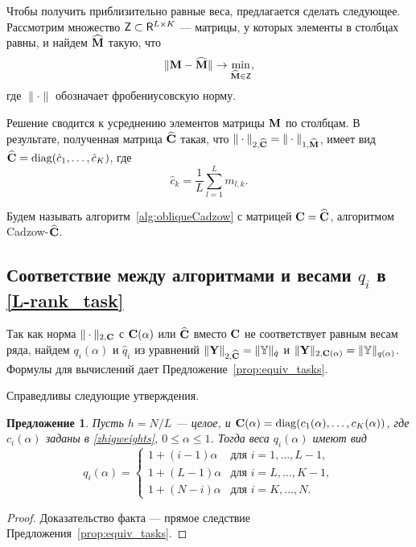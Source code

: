 \documentclass[12pt, specialist, subf,href,colorlinks=true,substylefile = spbu.rtx]{disser}
\newtheorem{proposition}{Предложение}
\theoremstyle{remark}
\theoremstyle{definition}
\begin{document}
Чтобы получить приблизительно равные веса, предлагается сделать следующее. Рассмотрим множество $\mathsf{Z} \subset \mathsf{R}^{L \times K}$ --- матрицы, у которых элементы в столбцах равны, и найдем $\widehat{\mathbf{M}}$ такую, что
\begin{equation*}
\|\mathbf{M} - \widehat{\mathbf{M}}\| \to \min_{\widehat{\mathbf{M}} \in \mathsf{Z}},
\end{equation*}
где $\|\cdot\|$ обозначает фробениусовскую норму.

Решение сводится к усреднению элементов матрицы $\mathbf{M}$ по столбцам.  В результате, полученная матрица $\widehat{\mathbf{C}}$ такая, что $\|\cdot\|_{2,\widehat{\mathbf{C}}}=\|\cdot\|_{1,\widehat{\mathbf{M}}}$, имеет вид $\widehat{\mathbf{C}} = \text{diag}(\hat c_1, \ldots, \hat c_K)$, где
\begin{equation}\label{my_s}
\hat c_k = \frac{1}{L}\sum_{l=1}^L m_{l, k}.
\end{equation}

Будем называть алгоритм~\ref{alg:obliqueCadzow} с матрицей $\mathbf{C}=\widehat{\mathbf{C}}$, алгоритмом Cadzow-$\widehat{\mathbf{C}}$.

\subsection{Соответствие между алгоритмами и весами $q_i$ в \eqref{L-rank_task}}

Так как норма $\|\cdot\|_{2, \mathbf{C}}$ с $\mathbf{C}(\alpha)$ или $\widehat{\mathbf{C}}$ вместо $\mathbf{C}$ не соответствует равным весам ряда,
найдем $q_i(\alpha)$ и $\hat{q}_i$ из уравнений
$\|\mathbf{Y}\|_{2,\widehat{\mathbf{C}}}=\|\mathbb{Y}\|_{\hat{q}}$ и $\|\mathbf{Y}\|_{2,\mathbf{C}(\alpha)}=\|\mathbb{Y}\|_{q(\alpha)}$.
Формулы для вычислений дает Предложение~\ref{prop:equiv_tasks}.

Справедливы следующие утверждения.

\begin{proposition}\label{prop:zhigconseq}
Пусть $h = N/L$ --- целое, и $\mathbf{C}(\alpha) =  \mathop{\mathrm{diag}}(c_1(\alpha), \ldots, c_K(\alpha))$, где $c_i(\alpha)$ заданы в \eqref{zhigweights}, $0 \le \alpha \le 1$. Тогда веса $q_i(\alpha)$ имеют вид
\begin{equation*}
q_i (\alpha) = \begin{cases}
1 + (i - 1) \alpha & \text{для $i = 1, \ldots, L-1,$}\\
1 + (L - 1) \alpha & \text{для $i = L, \ldots, K-1,$}\\
1 + (N - i) \alpha & \text{для $i = K, \ldots, N.$}
\end{cases}
\end{equation*}
\end{proposition}
\begin{proof}
	Доказательство факта --- прямое следствие Предложения~\ref{prop:equiv_tasks}.
\end{proof}
\end{document}
